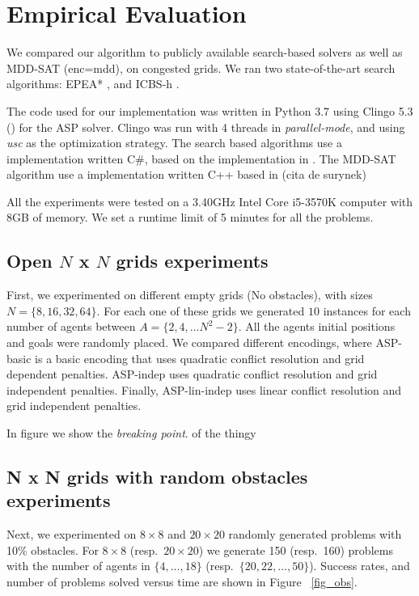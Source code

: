 \section{Empirical Evaluation}



We compared our algorithm to publicly available search-based solvers as well as MDD-SAT \cite{Surynek14} (enc=mdd), on congested grids. We ran two state-of-the-art search algorithms:  EPEA* \cite{Goldenberg14}, and ICBS-h \cite{FelnerLB00KK18}.

The code used for our implementation was written in Python 3.7 using Clingo 5.3 () for the ASP solver. Clingo was run with 4 threads in \textit{parallel-mode}, and using \textit{usc} as the optimization strategy. The search based algorithms use a implementation written C\#, based on the implementation in \cite{FelnerLB00KK18}. The MDD-SAT algorithm use a implementation written C++ based in (cita de surynek)

All the experiments were tested on a 3.40GHz Intel Core i5-3570K computer with 8GB of memory. We set a runtime limit of 5 minutes for all the problems.

\subsection{Open $N$ x $N$ grids experiments} First, we experimented on different empty grids (No obstacles), with sizes $N=\{8,16,32,64\}$. For each one of these grids we generated $10$ instances
for each number of agents between $A=\{2,4, \ldots N^2 -2 \}$. All the agents initial positions and goals were randomly placed. We compared different encodings, where ASP-basic is a basic encoding that uses quadratic conflict resolution and grid dependent penalties. ASP-indep uses quadratic conflict resolution and grid independent penalties. Finally, ASP-lin-indep uses linear conflict resolution and grid independent penalties.


In figure we show the \emph{breaking point}. of the thingy


\subsection{N x N grids with random obstacles experiments} 
Next, we experimented on $8\times 8$ and $20\times 20$ randomly generated problems with 10\% obstacles. For $8\times8$ (resp.~$20\times 20$) we generate 150 (resp.~160) problems with the number of agents in $\{4,\dots,18\}$ (resp.~$\{20,22,\ldots,50\}$). Success rates, and number of problems solved versus time are shown in Figure ~\ref{fig_obs}. 

